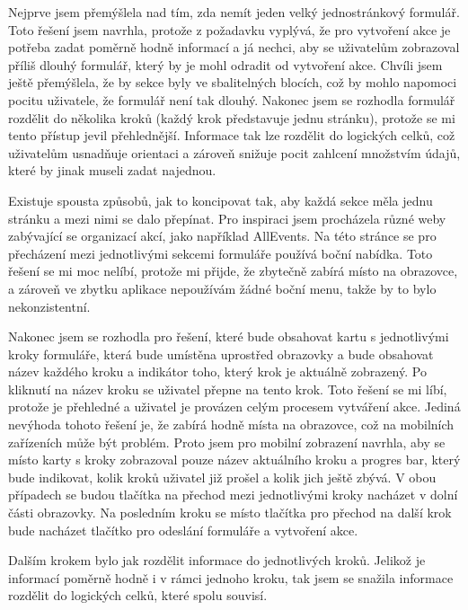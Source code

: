 Nejprve jsem přemýšlela nad tím, zda nemít jeden velký jednostránkový formulář. Toto řešení jsem navrhla, protože z požadavku vyplývá, že pro vytvoření akce je potřeba zadat poměrně hodně informací a já nechci, aby se uživatelům zobrazoval příliš dlouhý formulář, který by je mohl odradit od vytvoření akce. Chvíli jsem ještě přemýšlela, že by sekce byly ve sbalitelných blocích, což by mohlo napomoci pocitu uživatele, že formulář není tak dlouhý. Nakonec jsem se rozhodla formulář rozdělit do několika kroků (každý krok představuje jednu stránku), protože se mi tento přístup jevil přehlednější. Informace tak lze rozdělit do logických celků, což uživatelům usnadňuje orientaci a zároveň snižuje pocit zahlcení množstvím údajů, které by jinak museli zadat najednou.

Existuje spousta způsobů, jak to koncipovat tak, aby každá sekce měla jednu stránku a mezi nimi se dalo přepínat. Pro inspiraci jsem procházela různé weby zabývající se organizací akcí, jako například AllEvents. Na této stránce se pro přecházení mezi jednotlivými sekcemi formuláře používá boční nabídka. Toto řešení se mi moc nelíbí, protože mi přijde, že zbytečně zabírá místo na obrazovce, a zároveň ve zbytku aplikace nepoužívám žádné boční menu, takže by to bylo nekonzistentní.

Nakonec jsem se rozhodla pro řešení, které bude obsahovat kartu s jednotlivými kroky formuláře, která bude umístěna uprostřed obrazovky a bude obsahovat název každého kroku a indikátor toho, který krok je aktuálně zobrazený. Po kliknutí na název kroku se uživatel přepne na tento krok. Toto řešení se mi líbí, protože je přehledné a uživatel je provázen celým procesem vytváření akce. Jediná nevýhoda tohoto řešení je, že zabírá hodně místa na obrazovce, což na mobilních zařízeních může být problém. Proto jsem pro mobilní zobrazení navrhla, aby se místo karty s kroky zobrazoval pouze název aktuálního kroku a progres bar, který bude indikovat, kolik kroků uživatel již prošel a kolik jich ještě zbývá. V obou případech se budou tlačítka na přechod mezi jednotlivými kroky nacházet v dolní části obrazovky. Na posledním kroku se místo tlačítka pro přechod na další krok bude nacházet tlačítko pro odeslání formuláře a vytvoření akce.

Dalším krokem bylo jak rozdělit informace do jednotlivých kroků. Jelikož je informací poměrně hodně i v rámci jednoho kroku, tak jsem se snažila informace rozdělit do logických celků, které spolu souvisí.

